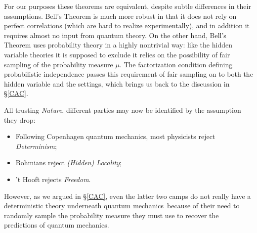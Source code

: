 \documentclass[12pt]{article}
\numberwithin{equation}{section}
\newcommand{\qm}{quantum mechanics}
\begin{document}
For our purposes these theorems are equivalent, despite subtle differences in their assumptions. Bell's Theorem is much more robust in that it does not rely on perfect correlations (which are hard to realize experimentally), and in addition it requires almost no input from quantum theory.
On the other hand,  Bell's Theorem uses  probability theory in a highly nontrivial way: like the hidden variable theories it is supposed to exclude it relies on the possibility of fair sampling of the probability measure $\mu$. The 
  factorization condition defining probabilistic independence passes this requirement of fair sampling on to both the hidden variable and the settings, which brings us back to the discussion in \S\ref{CAC}. 
 
All trusting \emph{Nature},  different parties may now be identified by the assumption they drop:

 \begin{itemize}
\item Following Copenhagen \qm, most physicists reject \emph{Determinism};
\item Bohmians reject  \emph{(Hidden) Locality};
\item 't Hooft rejects  \emph{Freedom}. 
\end{itemize}
However, as we argued in \S\ref{CAC}, even the latter two camps do not really have a deterministic theory underneath \qm\ because of their need to randomly sample the probability measure they must use to recover the predictions of \qm. 

  \newpage
{}

\raggedright
\end{document}
